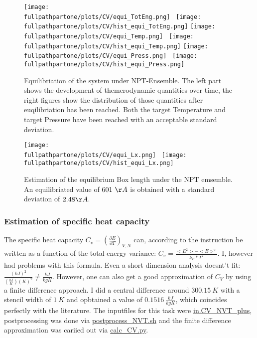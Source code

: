 \documentclass[10pt,a4paper]{report}
\def \pathpartone {../../1_three-dimensional_atomic_system}
\def \fullpathpartone {/home/lukas/Desktop/project/independence/atomistic_modeling/exam/1_three-dimensional_atomic_system}
\begin{document}
\begin{center}
\begin{figure}[h]
\texttt{[image: \\fullpathpartone/plots/CV/equi\_TotEng.png]}~
\texttt{[image: \\fullpathpartone/plots/CV/hist\_equi\_TotEng.png]}
\texttt{[image: \\fullpathpartone/plots/CV/equi\_Temp.png]}~
\texttt{[image: \\fullpathpartone/plots/CV/hist\_equi\_Temp.png]}
\texttt{[image: \\fullpathpartone/plots/CV/equi\_Press.png]}~
\texttt{[image: \\fullpathpartone/plots/CV/hist\_equi\_Press.png]}
\caption[aaa]{Equilibriation of the system under NPT-Ensemble. The left part shows the development of themerodynamic quantities over time, the right figures show the distribution of those quantities after euqilibriation has been reached. Both the target Temperature and target Pressure have been reached with an acceptable standard deviation.}
\label{fig:p1_CV_equi_NPT}
\end{figure}
\end{center}

\begin{center}
\begin{figure}[h]
\texttt{[image: \\fullpathpartone/plots/CV/equi\_Lx.png]}~
\texttt{[image: \\fullpathpartone/plots/CV/hist\_equi\_Lx.png]}
\caption[aaa]{Estimation of the equilibrium Box length under the NPT emsemble. An equilibriated  value of $601~\AA$ is obtained with a standard deviation of $2.48 \AA$.}
\label{fig:p1_CV_equi_NPT_lx}
\end{figure}
\end{center}


\subsubsection{Estimation of specific heat capacity}
The specific heat capacity $C_v=\left(\frac{\partial E}{\partial T}\right)_{V,N}$ can, according to the instruction be written as a function of the total energy variance: $C_v=\frac{<E^2>-<E>^2}{k_B*T^2}$. I, however had problems with this formula. Even a short dimension analysis doesnt't fit: $\frac{ {(kJ)}^2     }{ (\frac{kJ}{K}) {(K)}^2 } \neq \frac{kJ}{kg K}$.
However, one can also get a good approximation of $C_V$ by using a finite difference approach.
I did a central difference around $300.15~K$ with a stencil width of $1~K$ and opbtained a value of $0.1516~\frac{kJ}{kg K}$, which coincides perfectly with the literature.
The inputfiles for this task were \href{\pathpartone/in.CV_NVT_plus}{in.CV\_NVT\_plus}, postprocessing was done via \href{\pathpartone/postprocess_NVT.sh}{postprocess\_NVT.sh} and the finite difference approximation was cariied out via \href{\pathpartone/calc_CV.py}{calc\_CV.py}.
\end{document}

